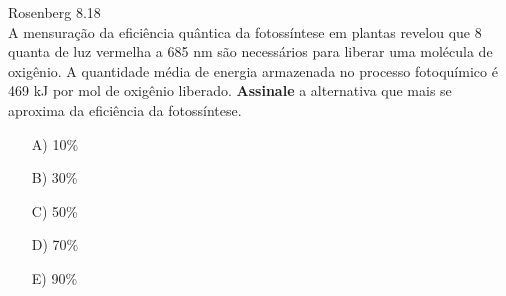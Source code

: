 \begin{problem}[answer=B]

    Rosenberg 8.18\\
    A mensuração da eficiência quântica da fotossíntese em plantas revelou que 8 quanta de luz vermelha a 685 nm são necessários para liberar uma molécula de oxigênio. A quantidade média de energia armazenada no processo fotoquímico é 469 kJ por mol de oxigênio liberado.
    \textbf{Assinale} a alternativa que mais se aproxima da eficiência da fotossíntese.
    \begin{itemize}
        \item [A)] 10\%
        \item [B)] 30\%
        \item [C)] 50\%
        \item [D)] 70\% 
        \item [E)] 90\%
\end{itemize}\\

\end{problem}
